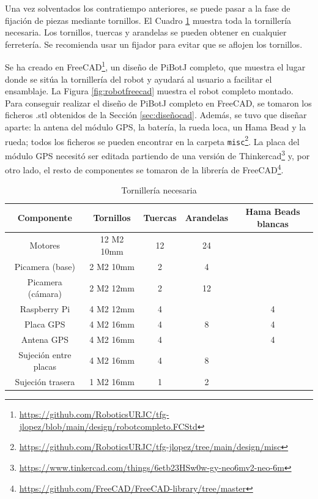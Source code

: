 Una vez solventados los contratiempo anteriores, se puede pasar a la fase de fijación de piezas mediante tornillos. El Cuadro \ref{cuadro:tornillos} muestra toda la tornillería necesaria. Los tornillos, tuercas y arandelas se pueden obtener en cualquier ferretería. Se recomienda usar un fijador para evitar que se aflojen los tornillos.

Se ha creado en FreeCAD\footnote{\url{https://github.com/RoboticsURJC/tfg-jlopez/blob/main/design/robotcompleto.FCStd}}, un diseño de PiBotJ completo, que muestra el lugar donde se sitúa la tornillería del robot y ayudará al usuario a facilitar el ensamblaje. La Figura \ref{fig:robotfreecad} muestra el robot completo montado. Para conseguir realizar el diseño de PiBotJ completo en FreeCAD, se tomaron los ficheros .stl obtenidos de la Sección \ref{sec:diseñocad}. Además, se tuvo que diseñar aparte: la antena del módulo \acs{GPS}, la batería, la rueda loca, un Hama Bead y la rueda; todos los ficheros se pueden encontrar en la carpeta \verb|misc|\footnote{\url{https://github.com/RoboticsURJC/tfg-jlopez/tree/main/design/misc}}. La placa del módulo \acs{GPS} necesitó ser editada partiendo de una versión de Thinkercad\footnote{\url{https://www.tinkercad.com/things/6etb23HSw0w-gy-neo6mv2-neo-6m}} y, por otro lado, el resto de componentes se tomaron de la librería de FreeCAD\footnote{\url{https://github.com/FreeCAD/FreeCAD-library/tree/master}}.

\begin{table}[H]
	\begin{center}
		\begin{tabular}{|c|c|c|c|c|}
			\hline
			Componente & Tornillos & Tuercas & Arandelas & Hama Beads blancas\\
			\hline
			Motores & 12 M2 10mm & 12 & 24 &\\
			\hline
			Picamera (base) & 2 M2 10mm & 2 & 4 &\\
			\hline
			Picamera (cámara) & 2 M2 12mm & 2 & 12 &\\
			\hline
			Raspberry Pi & 4 M2 12mm & 4 & & 4\\
			\hline
			Placa \acs{GPS} & 4 M2 16mm & 4 & 8 & 4\\
			\hline
			Antena \acs{GPS} & 4 M2 16mm & 4 & & 4\\
			\hline
			Sujeción entre placas & 4 M2 16mm & 4 & 8 &\\
			\hline
			Sujeción trasera & 1 M2 16mm & 1 & 2 &\\
			\hline
		\end{tabular}
		\caption{Tornillería necesaria}
		\label{cuadro:tornillos}
	\end{center}
\end{table}

